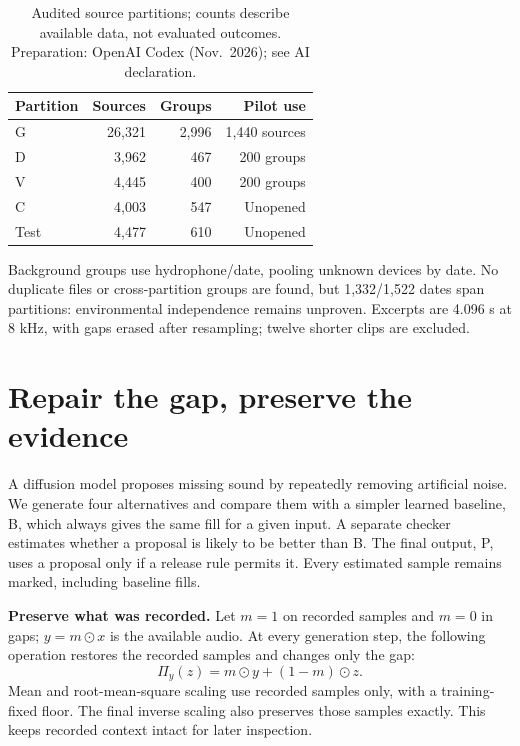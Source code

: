 \documentclass[runningheads,orivec]{llncs}
\begin{document}
\begin{table}[htbp]
\caption{Audited source partitions; counts describe available data, not evaluated outcomes. Preparation: OpenAI Codex (Nov.\ 2026); see AI declaration.}
\label{tab:1}
\centering\small
\begin{tabular*}{\linewidth}{@{\extracolsep{\fill}}lrrr@{}}
\toprule

\textbf{Partition} & \textbf{Sources} & \textbf{Groups} & \textbf{Pilot use} \\

\midrule

G & 26,321 & 2,996 & 1,440 sources \\

D & 3,962 & 467 & 200 groups \\

V & 4,445 & 400 & 200 groups \\

C & 4,003 & 547 & Unopened \\

Test & 4,477 & 610 & Unopened \\

\bottomrule
\end{tabular*}
\end{table}

Background groups use hydrophone/date, pooling unknown devices by date. No duplicate files or cross-partition groups are found, but 1,332/1,522 dates span partitions: environmental independence remains unproven. Excerpts are 4.096 s at 8 kHz, with gaps erased after resampling; twelve shorter clips are excluded.

\section{Repair the gap, preserve the evidence}

A diffusion model proposes missing sound by repeatedly removing artificial noise. We generate four alternatives and compare them with a simpler learned baseline, B, which always gives the same fill for a given input. A separate checker estimates whether a proposal is likely to be better than B. The final output, P, uses a proposal only if a release rule permits it. Every estimated sample remains marked, including baseline fills.

\textbf{Preserve what was recorded.} Let $m=1$ on recorded samples and $m=0$ in gaps; $y=m\odot x$ is the available audio. At every generation step, the following operation restores the recorded samples and changes only the gap:
\begin{equation}
\Pi_y(z)=m\odot y+(1-m)\odot z.\label{eq:projection}
\end{equation}
Mean and root-mean-square scaling use recorded samples only, with a training-fixed floor. The final inverse scaling also preserves those samples exactly. This keeps recorded context intact for later inspection.
\end{document}
